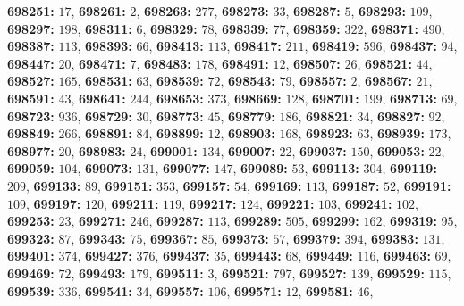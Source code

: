 \textsf{\bfseries 698251:} $17$, \textsf{\bfseries 698261:} $2$, \textsf{\bfseries 698263:} $277$, \textsf{\bfseries 698273:} $33$, \textsf{\bfseries 698287:} $5$, \textsf{\bfseries 698293:} $109$, \textsf{\bfseries 698297:} $198$, \textsf{\bfseries 698311:} $6$, \textsf{\bfseries 698329:} $78$, \textsf{\bfseries 698339:} $77$, \textsf{\bfseries 698359:} $322$, \textsf{\bfseries 698371:} $490$, \textsf{\bfseries 698387:} $113$, \textsf{\bfseries 698393:} $66$, \textsf{\bfseries 698413:} $113$, \textsf{\bfseries 698417:} $211$, \textsf{\bfseries 698419:} $596$, \textsf{\bfseries 698437:} $94$, \textsf{\bfseries 698447:} $20$, \textsf{\bfseries 698471:} $7$, \textsf{\bfseries 698483:} $178$, \textsf{\bfseries 698491:} $12$, \textsf{\bfseries 698507:} $26$, \textsf{\bfseries 698521:} $44$, \textsf{\bfseries 698527:} $165$, \textsf{\bfseries 698531:} $63$, \textsf{\bfseries 698539:} $72$, \textsf{\bfseries 698543:} $79$, \textsf{\bfseries 698557:} $2$, \textsf{\bfseries 698567:} $21$, \textsf{\bfseries 698591:} $43$, \textsf{\bfseries 698641:} $244$, \textsf{\bfseries 698653:} $373$, \textsf{\bfseries 698669:} $128$, \textsf{\bfseries 698701:} $199$, \textsf{\bfseries 698713:} $69$, \textsf{\bfseries 698723:} $936$, \textsf{\bfseries 698729:} $30$, \textsf{\bfseries 698773:} $45$, \textsf{\bfseries 698779:} $186$, \textsf{\bfseries 698821:} $34$, \textsf{\bfseries 698827:} $92$, \textsf{\bfseries 698849:} $266$, \textsf{\bfseries 698891:} $84$, \textsf{\bfseries 698899:} $12$, \textsf{\bfseries 698903:} $168$, \textsf{\bfseries 698923:} $63$, \textsf{\bfseries 698939:} $173$, \textsf{\bfseries 698977:} $20$, \textsf{\bfseries 698983:} $24$, \textsf{\bfseries 699001:} $134$, \textsf{\bfseries 699007:} $22$, \textsf{\bfseries 699037:} $150$, \textsf{\bfseries 699053:} $22$, \textsf{\bfseries 699059:} $104$, \textsf{\bfseries 699073:} $131$, \textsf{\bfseries 699077:} $147$, \textsf{\bfseries 699089:} $53$, \textsf{\bfseries 699113:} $304$, \textsf{\bfseries 699119:} $209$, \textsf{\bfseries 699133:} $89$, \textsf{\bfseries 699151:} $353$, \textsf{\bfseries 699157:} $54$, \textsf{\bfseries 699169:} $113$, \textsf{\bfseries 699187:} $52$, \textsf{\bfseries 699191:} $109$, \textsf{\bfseries 699197:} $120$, \textsf{\bfseries 699211:} $119$, \textsf{\bfseries 699217:} $124$, \textsf{\bfseries 699221:} $103$, \textsf{\bfseries 699241:} $102$, \textsf{\bfseries 699253:} $23$, \textsf{\bfseries 699271:} $246$, \textsf{\bfseries 699287:} $113$, \textsf{\bfseries 699289:} $505$, \textsf{\bfseries 699299:} $162$, \textsf{\bfseries 699319:} $95$, \textsf{\bfseries 699323:} $87$, \textsf{\bfseries 699343:} $75$, \textsf{\bfseries 699367:} $85$, \textsf{\bfseries 699373:} $57$, \textsf{\bfseries 699379:} $394$, \textsf{\bfseries 699383:} $131$, \textsf{\bfseries 699401:} $374$, \textsf{\bfseries 699427:} $376$, \textsf{\bfseries 699437:} $35$, \textsf{\bfseries 699443:} $68$, \textsf{\bfseries 699449:} $116$, \textsf{\bfseries 699463:} $69$, \textsf{\bfseries 699469:} $72$, \textsf{\bfseries 699493:} $179$, \textsf{\bfseries 699511:} $3$, \textsf{\bfseries 699521:} $797$, \textsf{\bfseries 699527:} $139$, \textsf{\bfseries 699529:} $115$, \textsf{\bfseries 699539:} $336$, \textsf{\bfseries 699541:} $34$, \textsf{\bfseries 699557:} $106$, \textsf{\bfseries 699571:} $12$, \textsf{\bfseries 699581:} $46$, 

